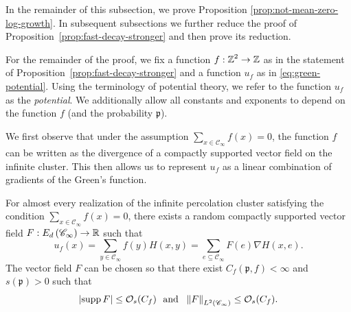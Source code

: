 \documentclass[12pt]{amsart}
\numberwithin{equation}{section}
\begin{document}
	
	In the remainder of this subsection, we prove Proposition \ref{prop:not-mean-zero-log-growth}. 
	In subsequent subsections we further reduce the proof of Proposition~\ref{prop:fast-decay-stronger}
	and then prove its reduction. 
	
	For the remainder of the proof, we fix a function $f: \operatorname{\mathbb{Z}}^2 \to \operatorname{\mathbb{Z}}$ as in the statement of Proposition~\ref{prop:fast-decay-stronger} and a function $u_f$ as in \eqref{eq:green-potential}. Using the terminology of potential theory, we refer to the function $u_f$ as the {\it potential}. We additionally allow all constants and exponents to depend on the function $f$ (and the probability $\mathfrak{p}$).
	
	We first observe that under the assumption $\sum_{x \in \mathscr{C}_\infty} f(x) = 0$, the function $f$ can be written as the divergence of a compactly supported vector field on the infinite cluster. This then allows us to represent $u_f$ as a linear combination of gradients of the Green's function. 
	
	\begin{lemma} \label{lemma:mean-zero-representation}
		For almost every realization of the infinite percolation cluster satisfying the condition $\sum_{x \in \mathscr{C}_{\infty}} f(x) = 0$, there exists a random compactly supported vector field $F : E_d \left( \mathscr{C}_\infty \right) \to \operatorname{\mathbb{R}}$
		such that
		\begin{equation} \label{eq:gradient-representation}
			u_f (x) = \sum_{y \in \mathscr{C}_\infty} f(y) H(x , y)  = \sum_{e \subseteq \mathscr{C}_\infty} F(e) \nabla H(x, e).
		\end{equation}
		The vector field $F$ can be chosen so that there exist $C_f(\mathfrak{p} , f) < \infty$ and $s(\mathfrak{p} ) > 0 $ such that
		\begin{equation} \label{eq:estimates-on-F}
			\left| \mathrm{supp\,} F\right| \leq \mathcal{O}_s (C_f) ~~\mbox{and} ~~ \left\| F \right\|_{L^2(\mathscr{C}_\infty)}  \leq \mathcal{O}_s (C_f).
		\end{equation}
	\end{lemma}
	
\end{document}
